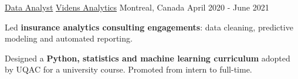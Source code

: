 \begin{cventries}
  \cventry
    {\href{https://www.videns.ai/}{Data Analyst}}
    {\href{https://www.videns.ai/}{Videns Analytics}}
    {Montreal, Canada}
    {April 2020 - June 2021}
    {
      \begin{cvitems}
        \item{Led \textbf{insurance analytics consulting engagements}: data cleaning, predictive modeling and automated reporting.}
        \item{Designed a \textbf{Python, statistics and machine learning curriculum} adopted by UQAC for a university course. Promoted from intern to full-time.}
      \end{cvitems}
    }
\end{cventries}
